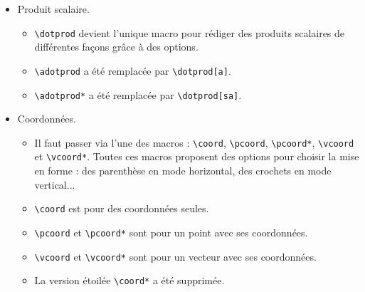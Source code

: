 \documentclass[12pt,a4paper]{book}
\newcommand\env[1]{\texttt{#1}}
\newcommand\macro[1]{\env{\textbackslash{}#1}}
\theoremstyle{definition}
\begin{document}
{{\begin{description}
\begin{itemize}[itemsep=.5em]
\begin{itemize}[itemsep=.5em]
\begin{itemize}[itemsep=.5em, label=$\rightarrow$]
                \item \macro{hangleorient*} a été remplacée par \macro{dotprod[sh]}.
    	    \end{itemize}
    
    
            \item Produit scalaire.
            
            \begin{itemize}[itemsep=.5em, label=$\rightarrow$]
                \item \macro{dotprod} devient l'unique macro pour rédiger des produits scalaires de différentes façons grâce à des options.
                
                \item \macro{adotprod}  a été remplacée par \macro{dotprod[a]}.
    
                \item \macro{adotprod*} a été remplacée par \macro{dotprod[sa]}.
    	    \end{itemize}
    
    
            \item Coordonnées.
            
            \begin{itemize}[itemsep=.5em, label=$\rightarrow$]
                \item Il faut passer via l'une des macros : \macro{coord}, \macro{pcoord}, \macro{pcoord*}, \macro{vcoord} et \macro{vcoord*}.
                      Toutes ces macros proposent des options pour choisir la mise en forme : des parenthèse en mode horizontal, des crochets en mode vertical...
    
                \item \macro{coord} est pour des coordonnées seules.
    
                \item \macro{pcoord} et \macro{pcoord*} sont pour un point avec ses coordonnées.
    
                \item \macro{vcoord} et \macro{vcoord*} sont pour un vecteur avec ses coordonnées.
    
                \item La version étoilée \macro{coord*} a été supprimée. 
    	    \end{itemize}
    

\end{itemize}
\end{itemize}
\end{description}}}
\end{document}
